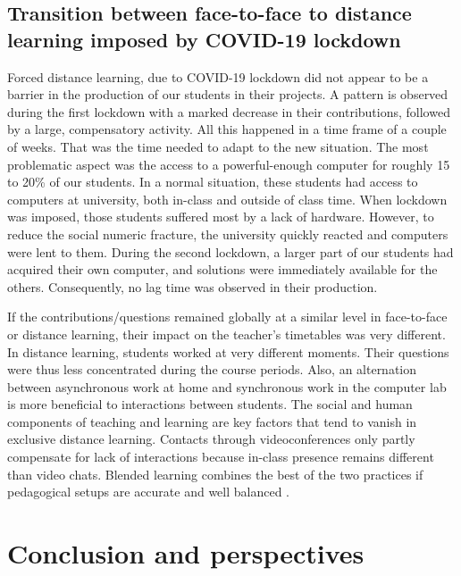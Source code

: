 \documentclass{aims}
\theoremstyle{definition}
\begin{document}
\hypertarget{transition-between-face-to-face-to-distance-learning-imposed-by-covid-19-lockdown-2}{%
\subsection{Transition between face-to-face to distance learning imposed
by COVID-19
lockdown}\label{transition-between-face-to-face-to-distance-learning-imposed-by-covid-19-lockdown-2}}

Forced distance learning, due to COVID-19 lockdown did not appear to be
a barrier in the production of our students in their projects. A pattern
is observed during the first lockdown with a marked decrease in their
contributions, followed by a large, compensatory activity. All this
happened in a time frame of a couple of weeks. That was the time needed
to adapt to the new situation. The most problematic aspect was the
access to a powerful-enough computer for roughly 15 to 20\% of our
students. In a normal situation, these students had access to computers
at university, both in-class and outside of class time. When lockdown
was imposed, those students suffered most by a lack of hardware.
However, to reduce the social numeric fracture, the university quickly
reacted and computers were lent to them. During the second lockdown, a
larger part of our students had acquired their own computer, and
solutions were immediately available for the others. Consequently, no
lag time was observed in their production.

If the contributions/questions remained globally at a similar level in
face-to-face or distance learning, their impact on the teacher's
timetables was very different. In distance learning, students worked at
very different moments. Their questions were thus less concentrated
during the course periods. Also, an alternation between asynchronous
work at home and synchronous work in the computer lab is more beneficial
to interactions between students. The social and human components of
teaching and learning are key factors that tend to vanish in exclusive
distance learning. Contacts through videoconferences only partly
compensate for lack of interactions because in-class presence remains
different than video chats. Blended learning combines the best of the
two practices if pedagogical setups are accurate and well balanced
\cite{Bernard2014}.

\hypertarget{conclusion-and-perspectives}{%
\section{Conclusion and
perspectives}\label{conclusion-and-perspectives}}
\end{document}
